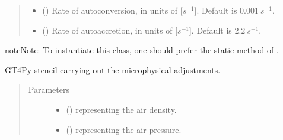 \documentclass[letterpaper,10pt,english]{sphinxmanual}
\begin{document}
\begin{fulllineitems}
\begin{fulllineitems}
\begin{quote}
\begin{description}
\begin{itemize}
\item {} 
 () \textendash{} Rate of autoconversion, in units of {[}\(s^{-1}\){]}. Default is \(0.001 ~ s^{-1}\).

\item {} 
 () \textendash{} Rate of autoaccretion, in units of {[}\(s^{-1}\){]}. Default is \(2.2 ~ s^{-1}\).

\end{itemize}

\end{description}\end{quote}

\begin{sphinxadmonition}{note}{Note:}
To instantiate this class, one should prefer the static method
{\hyperref[\detokenize{api:tasmania.parameterizations.adjustments.AdjustmentMicrophysics.factory}]{}} of
{\hyperref[\detokenize{api:tasmania.parameterizations.adjustments.AdjustmentMicrophysics}]{}}.
\end{sphinxadmonition}

\end{fulllineitems}


\begin{fulllineitems}
\label{\detokenize{api:tasmania.parameterizations.adjustment_microphysics_kessler_wrf.AdjustmentMicrophysicsKesslerWRF._stencil_adjustment_defs}}
GT4Py stencil carrying out the microphysical adjustments.
\begin{quote}\begin{description}
\item[{Parameters}] \leavevmode\begin{itemize}
\item {} 
 () \textendash{}  representing the air density.

\item {} 
 () \textendash{}  representing the air pressure.


\end{itemize}
\end{description}
\end{quote}
\end{fulllineitems}
\end{fulllineitems}
\end{document}
